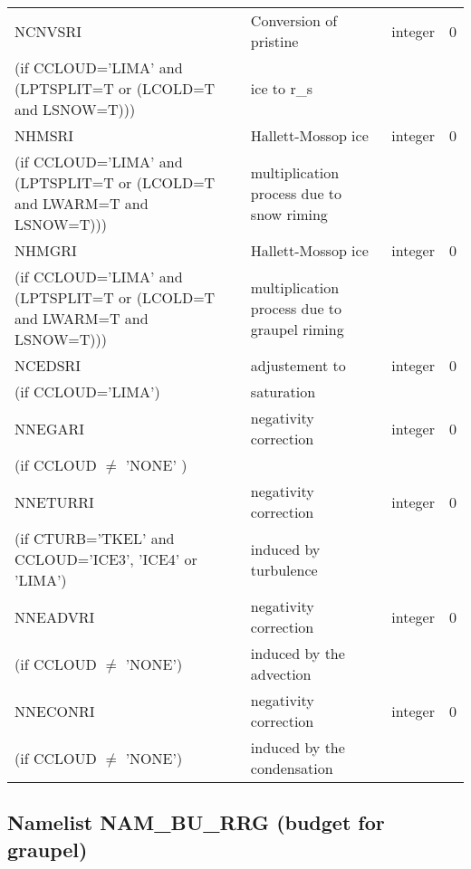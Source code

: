 \begin{longtable} {|p{}|p{}|>{\centering}p{}|p{}<{\centering}|}
NCNVSRI &  Conversion of pristine    & integer  &  0 \index{NCNVSRI!\innam{NAM\_BU\_RRI}}\\ \nopagebreak
(if CCLOUD='LIMA' and (LPTSPLIT=T or (LCOLD=T and LSNOW=T))) &ice to r\_s &   &  \\\hline
NHMSRI &Hallett-Mossop ice & integer  &  0 \index{NHMSRI!\innam{NAM\_BU\_RRI}}\\ \nopagebreak
(if CCLOUD='LIMA' and (LPTSPLIT=T or (LCOLD=T and LWARM=T and LSNOW=T))) &multiplication process due to snow riming &   &  \\\hline
NHMGRI &  Hallett-Mossop ice & integer  &  0 \index{NHMGRI!\innam{NAM\_BU\_RRI}}\\ \nopagebreak
(if CCLOUD='LIMA' and (LPTSPLIT=T or (LCOLD=T and LWARM=T and LSNOW=T))) &multiplication process due to graupel riming &   &  \\\hline
NCEDSRI & adjustement to   & integer  &  0 \index{NCEDSRI!\innam{NAM\_BU\_RRI}}\\ \nopagebreak
(if CCLOUD='LIMA') & saturation &   &  \\\hline
NNEGARI   & negativity correction & integer  &  0 \index{NNEGARI!\innam{NAM\_BU\_RRI}}\\ \nopagebreak
(if CCLOUD $\neq$ 'NONE' )& &   &  \\\hline
NNETURRI  &negativity correction   & integer  &  0 \index{NNETURRI!\innam{NAM\_BU\_RRI}}\\ \nopagebreak
(if CTURB='TKEL' and CCLOUD='ICE3', 'ICE4' or 'LIMA')   &induced by turbulence   &       &   \\\hline
NNEADVRI  & negativity correction  & integer  &  0 \index{NNEADVRI!\innam{NAM\_BU\_RRI}}\\ \nopagebreak
(if CCLOUD $\neq$ 'NONE') & induced by the advection&   &  \\\hline
NNECONRI  &negativity correction    & integer  &  0 \index{NNECONRI!\innam{NAM\_BU\_RRI}}\\ \nopagebreak
(if CCLOUD $\neq$ 'NONE') &induced by the condensation &   &  \\\hline
\end{longtable}

\subsection{Namelist NAM\_BU\_RRG (budget for graupel)}

